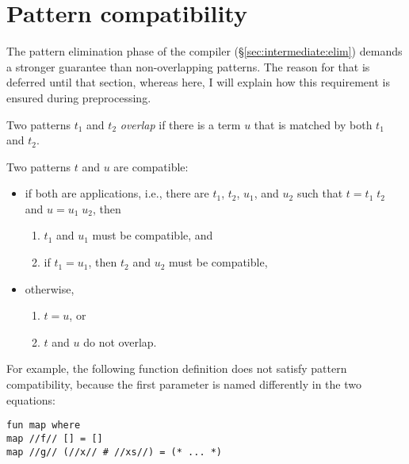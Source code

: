
\section{Pattern compatibility}
\label{sec:preproc:compatibility}

The pattern elimination phase of the compiler (§\ref{sec:intermediate:elim}) demands a stronger guarantee than non-overlapping patterns.
The reason for that is deferred until that section, whereas here, I will explain how this requirement is ensured during preprocessing.

\begin{definition}\label{def:preproc:compatibility:overlapping}
  Two patterns $t_1$ and $t_2$ \emph{overlap} if there is a term $u$ that is matched by both $t_1$ and $t_2$.
\end{definition}


\begin{definition}\label{def:preproc:compatibility}
  Two patterns $t$ and $u$ are compatible:
  \begin{itemize}
    \item
      if both are applications, i.e., there are $t_1$, $t_2$, $u_1$, and $u_2$ such that $t = t_1\;t_2$ and $u = u_1\;u_2$, then
      \begin{enumerate}
        \item $t_1$ and $u_1$ must be compatible, and
        \item if $t_1 = u_1$, then $t_2$ and $u_2$ must be compatible,
      \end{enumerate}
    \item
      otherwise,
      \begin{enumerate}
        \item $t = u$, or
        \item $t$ and $u$ do not overlap.
      \end{enumerate}
  \end{itemize}
\end{definition}

\noindent
For example, the following function definition does not satisfy pattern compatibility, because the first parameter is named differently in the two equations:
%
\begin{lstlisting}[language=Isabelle]
fun map where
map //f// [] = []
map //g// (//x// # //xs//) = (* ... *)
\end{lstlisting}


